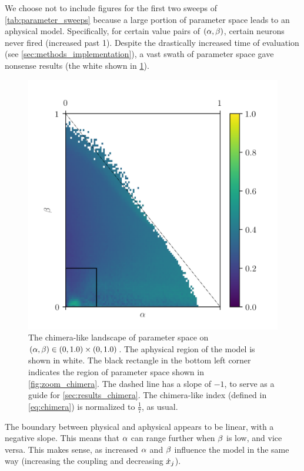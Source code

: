 We choose not to include figures for the first two sweeps of \cref{tab:parameter_sweeps} because a large portion of parameter space leads to an aphysical model.
Specifically, for certain value pairs of $\pqty{\hra, \hrb}$, certain neurons never fired (increased past 1).
Despite the drastically increased time of evaluation (see \cref{sec:methods_implementation}), a vast swath of parameter space gave nonsense results (the white shown in \cref{fig:aphysical_chimera}).
\begin{figure}[ht]
  \centering
  \includegraphics[width=\columnwidth]{figure/aphysical_chimera}
  \caption[Chimera-like index landscape]{
    The chimera-like landscape of parameter space on $\pqty{\hra, \hrb} \in \pqty{0, 1.0} \times \pqty{0, 1.0}$.
    The aphysical region of the model is shown in white.
    The black rectangle in the bottom left corner indicates the region of parameter space shown in \cref{fig:zoom_chimera}.
    The dashed line has a slope of $-1$, to serve as a guide for \cref{sec:results_chimera}.
    The chimera-like index (defined in \cref{eq:chimera}) is normalized to $\frac{1}{7}$, as usual.
  }
  \label{fig:aphysical_chimera}
\end{figure}
The boundary between physical and aphysical appears to be linear, with a negative slope.
This means that $\alpha$ can range further when $\beta$ is low,
and vice versa.
This makes sense, as increased $\alpha$ and $\beta$ influence the model in the same way (increasing the coupling and decreasing $\dot{x}_{j}$).

